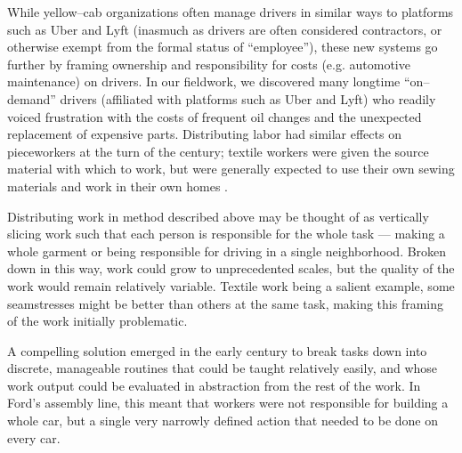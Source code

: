 \documentclass{sigchi}
\newcommand{\msb}[1]{{\color{PineGreen}[MSB: #1]}}
\begin{document}
While yellow--cab organizations often manage drivers in similar ways to platforms such as Uber and Lyft
(inasmuch as drivers are often considered contractors, or otherwise exempt from the formal status of ``employee''),
these new systems go further
by framing ownership and responsibility for costs
(e.g. automotive maintenance)
on drivers.
In our fieldwork, we discovered many longtime ``on--demand'' drivers
(affiliated with platforms such as Uber and Lyft)
who readily voiced frustration with the costs of
frequent oil changes and the unexpected replacement of expensive parts.
Distributing labor had similar effects on pieceworkers at the turn of the  century;
textile workers were given the source material with which to work,
but were generally expected to use their own sewing materials and work in their own homes
\cite{hapke2004sweatshop}.



Distributing work in method described above may be thought of as vertically slicing work such that 
each person is responsible for the whole task
--- making a whole garment or being responsible for driving in a single neighborhood.
Broken down in this way, work could grow to unprecedented scales,
but the quality of the work would remain relatively variable.
Textile work being a salient example,
some seamstresses might be better than others at the same task,
making this framing of the work initially problematic.

A compelling solution emerged in the early  century to break tasks down into discrete,
manageable routines that could be taught relatively easily,
and whose work output could be evaluated in abstraction from the rest of the work.
In Ford's assembly line, this meant that workers were not responsible for building a whole car,
but a single very narrowly defined action that needed to be done on every car.
\end{document}
